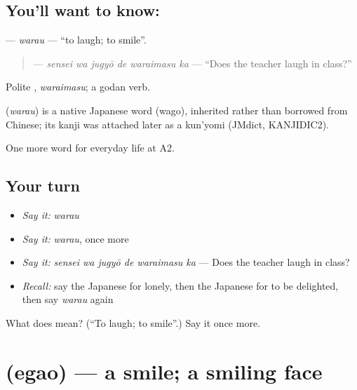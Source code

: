 \subsection*{You'll want to know: }
\textbf{} — \emph{warau} — \textquotedblleft{}to laugh; to smile\textquotedblright{}.

\begin{quote}
\textbf{  } — \emph{sensei wa jugyō de waraimasu ka} — \textquotedblleft{}Does the teacher laugh in class?\textquotedblright{}
\end{quote}

Polite \textbf{}, \emph{waraimasu}; a godan verb.

\begin{cousinweb}
\textbf{} (\emph{warau}) is a native Japanese word (wago), inherited rather than borrowed from Chinese; its kanji was attached later as a kun'yomi (JMdict, KANJIDIC2).
\end{cousinweb}

\begin{grammarlens}[title={What you've built}]
One more word for everyday life at A2.
\end{grammarlens}

\subsection*{Your turn}
\begin{itemize}
\raggedright
  \item \emph{Say it:} \emph{warau}
  \item \emph{Say it:} \emph{warau}, once more
  \item \emph{Say it:} \emph{sensei wa jugyō de waraimasu ka} — Does the teacher laugh in class?
  \item \emph{Recall:} say the Japanese for lonely, then the Japanese for to be delighted, then say \emph{warau} again
\end{itemize}

\begin{tcolorbox}[breakable,colback=teal!4,colframe=teal!35!black,title={Before you move on}]
What does  mean? (\textquotedblleft{}To laugh; to smile\textquotedblright{}.) Say it once more.
\end{tcolorbox}
\section[\texorpdfstring{\ja{えがお} (egao)}{えがお (egao)}]{ (egao) — a smile; a smiling face}

